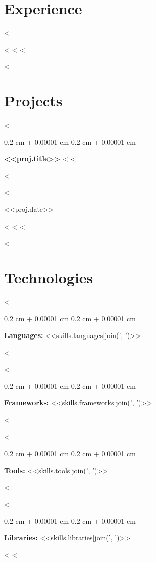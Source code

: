 \documentclass[10pt, letterpaper]{article}
\newenvironment{highlightsforbulletentries}{
    \begin{itemize}[
        topsep=0.10 cm,
        parsep=0.10 cm,
        partopsep=0pt,
        itemsep=0pt,
        leftmargin=10pt
    ]
}{
    \end{itemize}
} %
\newenvironment{onecolentry}{
    \begin{adjustwidth}{
        0.2 cm + 0.00001 cm
    }{
        0.2 cm + 0.00001 cm
    }
}{
    \end{adjustwidth}
} %
\newenvironment{twocolentry}[2][]{
    \onecolentry
    \def\secondColumn{#2}
    \setcolumnwidth{\fill, 4.5 cm}
    \begin{paracol}{2}
}{
    \switchcolumn \raggedleft \secondColumn
    \end{paracol}
    \endonecolentry
} %
\begin{document}
  \section{Experience}
  <%
    <%
  <%
  <%

  <%
  \section{Projects}
  <%
    \begin{twocolentry}{<<proj.date>>}
      {\textbf{<<proj.title>>} <%
      <%
      \begin{highlightsforbulletentries}
        <%
      \end{highlightsforbulletentries}
      <%
    \end{twocolentry}
    <%
  <%
  <%

  <%
    \section{Technologies}
      <%
      \begin{onecolentry}
        \textbf{Languages:} <<skills.languages|join(', ')>>
      \end{onecolentry}
      \smallskip
      <%

      <%
      \begin{onecolentry}
        \textbf{Frameworks:} <<skills.frameworks|join(', ')>>
      \end{onecolentry}
      \smallskip
      <%

      <%
      \begin{onecolentry}
        \textbf{Tools:} <<skills.tools|join(', ')>>
      \end{onecolentry}
      \smallskip
      <%
      
      <%
      \begin{onecolentry}
        \textbf{Libraries:} <<skills.libraries|join(', ')>>
      \end{onecolentry}
      <%
  <%
\end{document}
